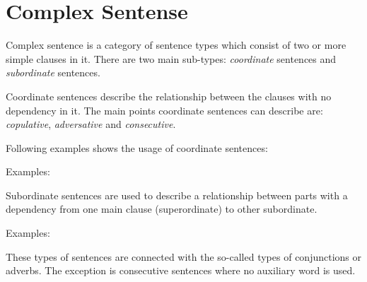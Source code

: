 \section{Complex Sentense}

Complex sentence is a category of sentence types which consist of two or more simple clauses in it. There are two main sub-types: \textit{coordinate} sentences and \textit{subordinate} sentences.

Coordinate sentences describe the relationship between the clauses with no dependency in it. The main points coordinate sentences can describe are: \textit{copulative}, \textit{adversative} and \textit{consecutive}.
 
Following examples shows the usage of coordinate sentences:

Examples:



Subordinate sentences are used to describe a relationship between parts with a dependency from one main clause (superordinate) to other subordinate.

Examples:



These types of sentences are connected with the so-called types of conjunctions or adverbs. The exception is consecutive sentences where no auxiliary word is used.